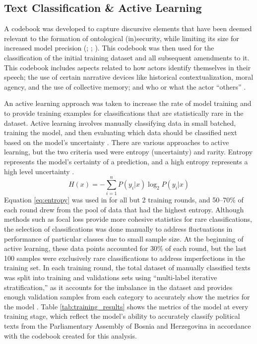\subsection{Text Classification \& Active Learning}
\label{subsec:classification}

A codebook was developed to capture discursive elements that have been deemed relevant to the formation of ontological (in)security, while limiting its size for increased model precision (\citealp[pg.~344-348]{mitzenOntologicalSecurityWorld2006}; \citealp[pg.~757-759]{kinnvall2004}; \citealp[pg.~2945-2947]{r.abas2022}). This codebook was then used for the classification of the initial training dataset and all subsequent amendments to it. This codebook includes aspects related to how actors identify themselves in their speech; the use of certain narrative devices like historical contextualization, moral agency, and the use of collective memory; and who or what the actor ``others'' \citep[pg.~259-265]{vandijk1993}. 

An active learning approach was taken to increase the rate of model training and to provide training examples for classifications that are statistically rare in the dataset. Active learning involves manually classifying data in small batched, training the model, and then evaluating which data should be classified next based on the model's uncertainty \citep[pg.~322-323]{vacareanu2024}. There are various approaches to active learning, but the two criteria used were entropy (uncertainty) and rarity. Entropy represents the model's certainty of a prediction, and a high entropy represents a high level uncertainty \citep[pg.~323]{vacareanu2024}. 
\begin{equation} \label{eq:entropy}
H(x) = -\sum_{i=1}^{n} P(y_i | x) \log_2 P(y_i | x)
\end{equation}
Equation \ref{eq:entropy} was used in for all but 2 training rounds, and 50--70\% of each round drew from the pool of data that had the highest entropy. Although methods such as focal loss provide more cohesive statistics for rare classifications, the selection of classifications was done manually to address fluctuations in performance of particular classes due to small sample size. At the beginning of active learning, these data points accounted for 30\% of each round, but the last 100 samples were exclusively rare classifications to address imperfections in the training set. In each training round, the total dataset of manually classified texts was split into training and validations sets using ``multi-label iterative stratification,'' as it accounts for the imbalance in the dataset and provides enough validation samples from each category to accurately show the metrics for the model \citep[pg.~146-148]{Sechidis2011-df}. Table \ref{tab:training_results} shows the metrics of the model at every training stage, which reflect the model's ability to accurately classify political texts from the Parliamentary Assembly of Bosnia and Herzegovina in accordance with the codebook created for this analysis.

